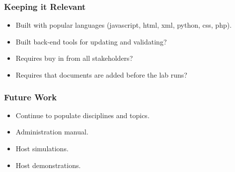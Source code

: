 \documentclass{beamer} %
\begin{document}
\begin{frame}
\frametitle{Keeping it Relevant}
	\begin{itemize}
		\item Built with popular languages (javascript, html, xml, python, css, php).
		\item Built back-end tools for updating and validating?
		\item Requires buy in from all stakeholders?
		\item Requires that documents are added before the lab runs?
	\end{itemize}
\end{frame}

\begin{frame}
\frametitle{Future Work}
	\begin{itemize}
		\item Continue to populate disciplines and topics.
		\item Administration manual.
		\item Host simulations.
		\item Host demonstrations.
	\end{itemize}
\end{frame}
\end{document}
